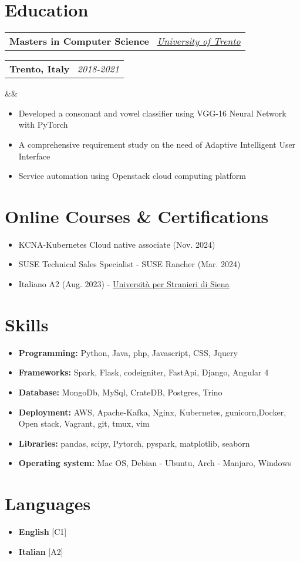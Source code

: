 \documentclass[10pt,a4paper,sans]{moderncv}
\makeatletter
\newcommand*{\customcventry}[7][.10em]{
	\begin{tabular}{@{}l}
		{\bfseries #4} \
		{\itshape #3}
	\end{tabular}
	\hfill
	\begin{tabular}{l@{}}
		{\bfseries #5} \
		{\itshape #2}
	\end{tabular}
	\ifx&#7&%
	\else{\
		\begin{minipage}{\maincolumnwidth}%
			\small#7%
	\end{minipage}}\fi%
	\par\addvspace{#1}}
\makeatother
\begin{document}
	\section{Education}
	\customcventry{2018-2021}{\color{blue}\href{https://www.unitn.it/en}{University of Trento}}{Masters in Computer Science}{Trento, Italy}{}{}{Courses: Machine Learning, Deep Learning, Big Data and Social Networks, Fog and Cloud Computing,Data Mining, Web Architectures, Requirement Engineering.}
	\begin{itemize}[label={\textbullet}]
		\itemsep0em 
		\item Developed a consonant and vowel classifier using VGG-16 Neural Network with PyTorch
		\item A comprehensive requirement study on the need of Adaptive Intelligent User Interface
		\item Service automation using Openstack cloud computing platform
	
	\end{itemize}
\section{Online Courses \& Certifications}
{\begin{itemize}[label=\textbullet]
		\itemsep0em
            \item KCNA-Kubernetes Cloud native associate (Nov. 2024)
		\item SUSE Technical Sales Specialist - SUSE Rancher (Mar. 2024)
		\item Italiano A2 (Aug. 2023) - \underline{\color{blue}\href{https://online.unistrasi.it/cils/attestati/20230720/431413_20230720_SINGOLO.pdf}{Università per Stranieri di Siena}}
\end{itemize}} 
	
	\section{Skills}
	{\begin{itemize}[label=\textbullet]
			\itemsep0em 
			\item {\textbf{Programming:} Python, Java, php, Javascript, CSS, Jquery}
			\item {\textbf{Frameworks:} Spark, Flask, codeigniter, FastApi, Django, Angular 4}
			\item {\textbf{Database:} MongoDb, MySql, CrateDB, Postgres, Trino}
			\item {\textbf{Deployment:} AWS, Apache-Kafka, Nginx, Kubernetes, gunicorn,Docker, Open stack, Vagrant, git, tmux, vim}
			\item {\textbf{Libraries:} pandas, scipy, Pytorch, pyspark, matplotlib, seaborn}
			\item {\textbf{Operating system:} Mac OS, Debian - Ubuntu, Arch - Manjaro, Windows}
	\end{itemize}}
	
	\section{Languages}
	\begin{multicols}{2}
		\begin{itemize}[label=\textbullet]
			\item \textbf{English} [C1]
			\item {\textbf{Italian} [A2]}
		\end{itemize}
	\end{multicols}
\end{document}
